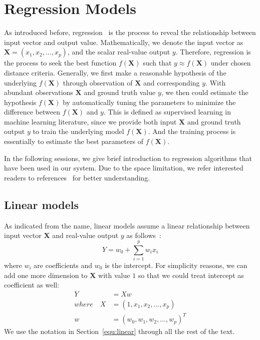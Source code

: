\section{Regression Models}
\label{sec:method}
As introduced before, regression~\cite{hastie2009elements} is the process to
reveal the relationship between input vector and output value. Mathematically,
we denote the input vector as $\mathbf{X} = (x_1, x_2, \ldots, x_p)$, and the
scalar real-value output $y$. Therefore, regression is the process to seek the
best function $f(\mathbf{X})$ such that $y \approx f(\mathbf{X})$ under chosen distance criteria.
Generally, we first make a reasonable hypothesis of the underlying
$f(\mathbf{X})$
through observation of $\mathbf{X}$ and corresponding $y$. With abundant observations
$\mathbf{X}$ and ground truth value $y$, we then could estimate the hypothesis $f(\mathbf{X})$ by
automatically tuning the parameters to minimize the difference between $f(\mathbf{X})$
and $y$. This is defined as supervised learning in machine learning literature,
since we provide both input $\mathbf{X}$ and ground truth output $y$ to train the
underlying model $f(\mathbf{X})$. And the training process is essentially to estimate
the best parameters of $f(\mathbf{X})$.

In the following sessions, we give brief introduction to regression algorithms
that have been used in our system. Due to the space limitation, we refer
interested readers to
references~\cite{bishop2006pattern,breiman2001random,collins2002,friedman2001,hardle1990,hastie2009elements,murphy2012machine,Tibshirani1996,zou2005}
for better understanding.

\subsection{Linear models}
\label{sub:linear_models}
As indicated from the name, linear models assume a linear relationship between
input vector $\mathbf{X}$ and real-value output $y$ as follows~\cite{hastie2009elements}:
\begin{equation}
  Y = w_0 + \sum\limits_{i=1}^p w_i{x_i}
\end{equation}
where $w_i$ are coefficients and $w_0$ is the intercept. For simplicity
reasons, we can add one more dimension to $\mathbf{X}$ with value $1$ so that
we could treat intercept as coefficient as well:
\begin{equation}
	\label{equ:linear}
	\begin{aligned}
		Y &= Xw \\
		where \quad X &= (1, x_1, x_2, \ldots, x_p) \\
		w &= {(w_0, w_1, w_2, \ldots, w_p)}^T
	\end{aligned}
\end{equation}
We use the notation in Section~\ref{equ:linear} through all the rest of the text.

